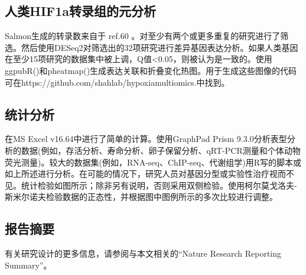 \documentclass{ctexart}
\begin{document}
        \subsection{人类HIF1a转录组的元分析}

        Salmon生成的转录数来自于 ref.60 。对至少有两个或更多重复的研究进行了筛选。然后使用DESeq2对筛选出的32项研究进行差异基因表达分析。如果人类基因在至少15项研究的数据集中被上调，Q值<0.05，则被认为是一致的。使用ggpubR()和pheatmap()生成表达关联和折叠变化热图。用于生成这些图像的代码可在https://github.com/shahlab/hypoxiamultiomics.中找到。

        \subsection{统计分析}

        在MS Excel v16.64中进行了简单的计算。使用GraphPad Prism 9.3.0分析表型分析的数据(例如，存活分析、寿命分析、卵子保留分析、qRT-PCR测量和个体动物荧光测量)。较大的数据集(例如，RNA-seq、ChIP-seq、代谢组学)用R写的脚本或如上所述进行分析。在可能的情况下，研究人员对基因分型或实验性治疗视而不见。统计检验如图所示；除非另有说明，否则采用双侧检验。使用柯尔莫戈洛夫-斯米尔诺夫检验数据的正态性，并根据图中图例所示的多次比较进行调整。

        \subsection{报告摘要}

        有关研究设计的更多信息，请参阅与本文相关的“Nature Research Reporting Summary”。
\end{document}
